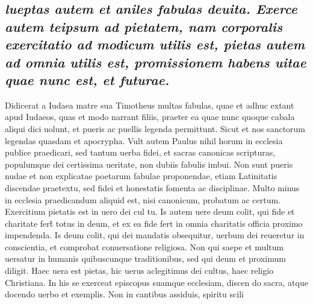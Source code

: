 \documentclass{article}
\begin{document}
\begin{pages}
\subsection*{\textit{lueptas autem et aniles fabulas deuita. Exerce autem teipsum ad pietatem, nam corporalis exercitatio ad modicum utilis est, pietas autem ad omnia utilis est, promissionem habens uitae quae nunc est, et futurae. }}\pstart Didicerat a Iudaea matre sua Timotheus multas fabulas, quae et adhuc extant apud Iudaeos, quas et modo narrant filiis, praeter ea quae nunc quoque cabala aliqui dici uolunt, et pueris ac puellis legenda permittunt. Sicut et nos sanctorum legendas quasdam et apocrypha. Vult autem Paulus nihil horum in ecclesia publice praedicari, sed tantum uerba fidei, et sacras canonicas scripturas, populumque  dei certissima ueritate, non dubiis fabulis imbui. Non sunt pueris nudae et non explicatae poetarum fabulae proponendae, etiam Latinitatis discendae praetextu, sed fidei et honestatis fomenta ac disciplinae. Multo minus in ecclesia praedicandum aliquid est, nisi canonicum, probatum ac certum. Exercitium pietatis est in uero dei cul tu. Is autem uere deum colit, qui fide et charitate fert̃ totus in deum, et ex ea fide fert in omnia charitatis officia proximo impendenda. Is deum colit, qui dei mandatis obsequitur, uerbum dei reueretur in conscientia, et comprobat conuersatione religiosa. Non qui saepe et multum uersatur in humanis quibuscunque traditionibus, sed qui deum et proximum diligit. Haec uera est pietas, hic uerus aclegitimus dei cultus, haec religio Christiana. In his se exerceat episcopus suamque ecclesiam, discen do sacra, atque docendo uerbo et exemplis. Non in cantibus assiduis, spiritu scili\pend

\end{pages}
\end{document}
